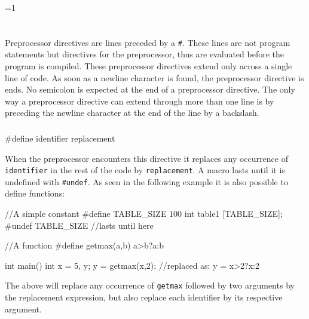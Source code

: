 \documentclass[10pt,a4paper]{scrartcl}
\gdef\conditionmacro{0}
\begin{document}
\begin{multicols*}{2}
\printnoidxglossary[sort=def,title={Terms},nonumberlist=true,nopostdot=true]

\ifnum\conditionmacro=1
\section{}
\label{sec:NiceToKnow}

\subsection{}
\label{sec:PreprocessorDirectives}

Preprocessor directives are lines preceded by a \verb+#+. These lines are not program statements but directives for the preprocessor, thus are evaluated before the program is compiled.
These preprocessor directives extend only across a single line of code. As soon as a newline character is found, the preprocessor directive is ends. No semicolon is expected at the end of a preprocessor directive. The only way a preprocessor directive can extend through more than one line is by preceding the newline character at the end of the line by a backslash.

\subsubsection{}
\label{sec:MarcoDefinitions}

\begin{TPCpp}
#define identifier replacement
\end{TPCpp}

When the preprocessor encounters this directive it replaces any occurrence of \verb+identifier+ in the rest of the code by \verb+replacement+. A macro lasts until it is undefined with \verb+#undef+. As seen in the following example it is also possible to define functions:

\begin{TPCpp}
//A simple constant
#define TABLE_SIZE 100
int table1 [TABLE_SIZE];
#undef TABLE_SIZE //lasts until here

//A function
#define getmax(a,b) a>b?a:b

int main(){
	int x = 5, y;
	y = getmax(x,2); //replaced as: y = x>2?x:2
}
\end{TPCpp}

The above will replace any occurrence of \verb+getmax+ followed by two arguments by the replacement expression, but also replace each identifier by its respective argument.


\end{multicols*}
\end{document}
